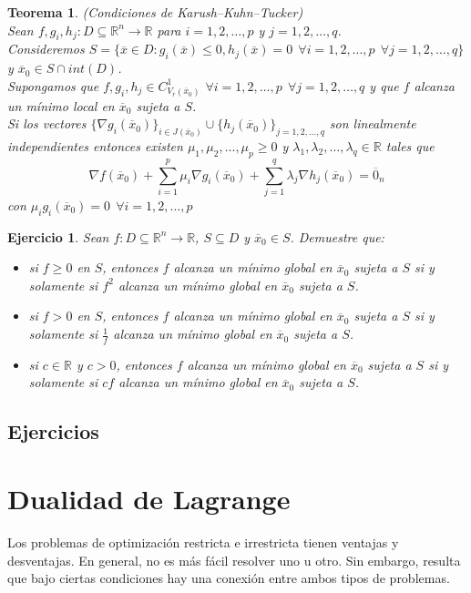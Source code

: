 \documentclass[11pt]{report}
\newtheorem{theorem}{Teorema}[section]
\newtheorem{exercise}{Ejercicio}[section]
\newcommand{\Rn}{\mathbb{R}^{n}}
\newcommand{\R}{\mathbb{R}}
\newcommand{\x}{\overline{x}}
\newcommand{\xz}{\overline{x}_{0}}
\newcommand{\z}{\overline{0}_{n}}
\newcommand{\Jxz}{J(\overline{x}_{0})}
\newcommand{\Sp}{1,2,\ldots, p}
\newcommand{\Sq}{1,2,\ldots, q}
\begin{document}
\begin{theorem}{(Condiciones de Karush--Kuhn--Tucker)}\\
Sean $f, g_{i}, h_{j}:D\subseteq\Rn\rightarrow\R$ para $i=\Sp$ y $j=\Sq$.\\
Consideremos $S=\{\x\in D:g_{i}(\x)\leq0, h_{j}(\x)=0\ \ \forall i=\Sp\ \ \forall j=\Sq\}$ y $\xz\in S\cap int(D)$.\\
Supongamos que $f,g_{i},h_{j}\in C_{V_{r}(\xz)}^{1}$ $\forall i=\Sp\ \ \forall j=\Sq$ y que $f$ alcanza un mínimo local en $\xz$ sujeta a $S$.\\
Si los vectores $\{\nabla g_{i}(\xz)\}_{i\in\Jxz}\cup\{h_{j}(\xz)\}_{j=\Sq}$ son linealmente independientes entonces existen $\mu_{1}, \mu_{2},\dots,\mu_{p}\geq0$ y $\lambda_{1},\lambda_{2},\ldots,\lambda_{q}\in\R$ tales que $$\nabla f(\xz)+\sum_{i=1}^{p}\mu_{i}\nabla g_{i}(\xz) + \sum_{j=1}^{q}\lambda_{j}\nabla h_{j}(\xz)=\z$$
con $\mu_{i}g_{i}(\xz)=0\ \ \forall i=\Sp$
\end{theorem}

\begin{exercise}
Sean $f:D\subseteq\R^{n}\rightarrow\R$, $S\subseteq D$ y $\xz\in S$. Demuestre que:
\begin{itemize}
\item[(i)] si $f\geq0$ en $S$, entonces $f$ alcanza un mínimo global en $\xz$ sujeta a $S$ si y solamente si $f^{2}$ alcanza un mínimo global en $\xz$ sujeta a $S$.
\item[(ii)] si $f>0$ en $S$, entonces $f$ alcanza un mínimo global en $\xz$ sujeta a $S$ si y solamente si $\frac{1}{f}$ alcanza un mínimo global en $\xz$ sujeta a $S$.
\item[(iii)] si $c\in\R$ y $c>0$, entonces $f$ alcanza un mínimo global en $\xz$ sujeta a $S$ si y solamente si $cf$ alcanza un mínimo global en $\xz$ sujeta a $S$. 
\end{itemize} 
\end{exercise}
\section*{Ejercicios}

\chapter{Dualidad de Lagrange}
Los problemas de optimización restricta e irrestricta tienen ventajas y desventajas. En general, no es más fácil resolver uno u otro. Sin embargo, resulta que bajo ciertas condiciones hay una conexión entre ambos tipos de problemas.\\
\end{document}
